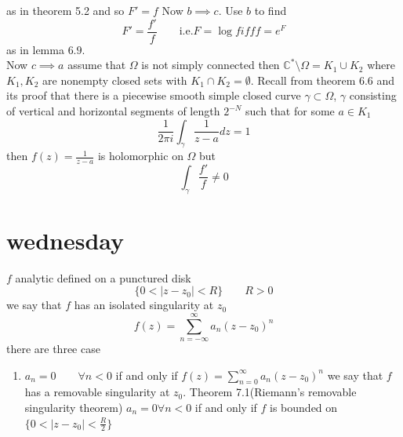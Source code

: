\documentclass[11pt]{article}
\begin{document}
as in theorem 5.2 and so $F' = f$
Now $b \implies c$. Use  $b$ to find
 \[
     F' = \frac{f'}{f} \qquad \text{i.e.} F = \log f  iff f = e^{F}
\] 
as in lemma $6.9$.\\
Now $c \implies a$ assume that  $\Omega$ is not simply connected then  $ \mathbb{C}^{*} \setminus \Omega = K_1 \cup K_2$ where $K_1,K_2$ are nonempty closed sets with $K_1 \cap K_2 = \emptyset$.
Recall from theorem 6.6 and its proof that there is a  piecewise smooth simple closed curve $\gamma \subset \Omega$, $\gamma$ consisting
of vertical and horizontal segments of length $2^{-N}$ such that for some $a \in K_1$
 \[
\frac{1}{2\pi i} \int_{\gamma}^{}\frac{1}{z-a}dz = 1
\] 
then $f(z) = \frac{1}{z-a}$ is holomorphic on $\Omega$ but
 \[
\int_{\gamma}^{}\frac{f'}{f} \ne 0
\] 

\section{wednesday}
$f$ analytic defined on a punctured disk
\[
    \{0 < |z-z_0| < R\}  \qquad R > 0
\] 
we say that $f$ has an isolated singularity at $z_0$
\[
f(z) = \sum_{n=-\infty}^{\infty} a_n(z-z_0)^{n}
\] 
there are three case
\begin{enumerate}
    \item $a_n = 0 \qquad \forall n < 0$ if and only if  $f(z) = \sum_{n=0}^{\infty}a_n(z-z_0)^{n}$ we say that
        $f$ has a removable singularity at $z_0$. Theorem 7.1(Riemann's removable singularity theorem) $a_n =0 \forall n < 0$ if and only if $f$ is bounded on $\{0 < |z-z_0| < \frac{R}{2}\}$
\end{enumerate}
\end{document}

